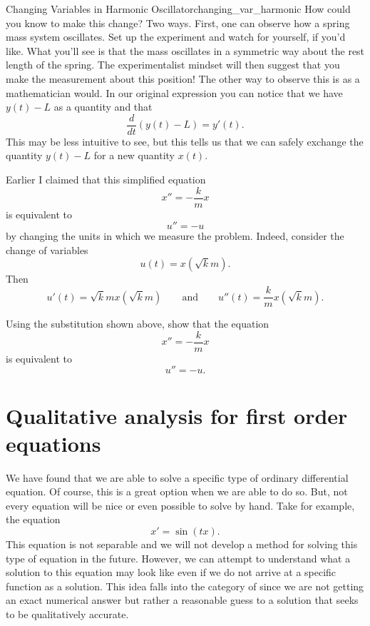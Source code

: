 \begin{ex}{Changing Variables in Harmonic Oscillator}{changing_var_harmonic}
        How could you know to make this change? Two ways.  First, one can observe how a spring mass system oscillates.  Set up the experiment and watch for yourself, if you'd like.  What you'll see is that the mass oscillates in a symmetric way about the rest length of the spring. The experimentalist mindset will then suggest that you make the measurement about this position! The other way to observe this is as a mathematician would.  In our original expression you can notice that we have $y(t)-L$ as a quantity and that 
        \[
        \frac{d}{dt} (y(t)-L) = y'(t).
        \]
        This may be less intuitive to see, but this tells us that we can safely exchange the quantity $y(t)-L$ for a new quantity $x(t).$
        \end{ex}
        
        Earlier I claimed that this simplified equation
        \[
        x'' = -\frac{k}{m}x
        \]
        is equivalent to
        \[
        u''=-u
        \]
        by changing the units in which we measure the problem.  Indeed, consider the change of variables
        \[
        u(t)=x\left( \sqrt{k}{m}\right).
        \]
        Then 
        \[
        u'(t)=\sqrt{k}{m}x\left(\sqrt{k}{m}\right) \qquad \textrm{and} \qquad u''(t)=\frac{k}{m}x\left( \sqrt{k}{m}\right).
        \]
        
        \begin{exercise}
        Using the substitution shown above, show that the equation
        \[
        x'' = -\frac{k}{m}x
        \]
        is equivalent to
        \[
        u''=-u.
        \]
        \end{exercise}
        
        \section{Qualitative analysis for first order equations}
        
            We have found that we are able to solve a specific type of ordinary differential equation.  Of course, this is a great option when we are able to do so. But, not every equation will be nice or even possible to solve by hand.  Take for example, the equation
            \[
            x'=\sin(tx).
            \]
            This equation is not separable and we will not develop a method for solving this type of equation in the future. However, we can attempt to understand what a solution to this equation may look like even if we do not arrive at a specific function as a solution. This idea falls into the category of  since we are not getting an exact numerical answer but rather a reasonable guess to a solution that seeks to be qualitatively accurate.
            
